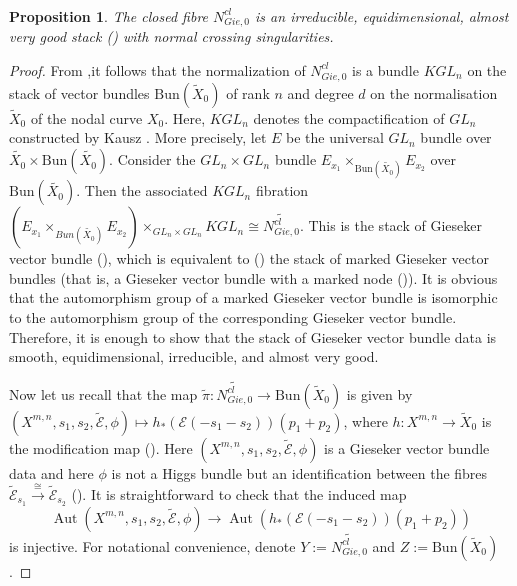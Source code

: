 \documentclass[11pt]{amsart}
\newcommand  {\Bun}   {\mathrm{Bun}}
\DeclareMathOperator{\Aut}{Aut}
\theoremstyle{plain}
\numberwithin{equation}{section}
\theoremstyle{definition}
\theoremstyle{plain}
\newtheorem{Prop}[Def]{Proposition}
\begin{document}
\

\begin{Prop}\label{new1}
The closed fibre $N^{cl}_{Gie,0}$ is an irreducible, equidimensional, almost very good stack (\cite[Definition 2.1.2]{32e}) with normal crossing singularities.
\end{Prop}

\begin{proof}
From \cite[Theorem 9.5]{16a},it follows that the normalization of $N^{cl}_{Gie,0}$ is a bundle $KGL_n$ on the stack of vector bundles $\Bun(\tilde{X}_0)$ of rank $n$ and degree $d$ on the normalisation $\tilde{X}_0$ of the nodal curve $X_0$. Here, $KGL_n$ denotes the compactification of $GL_n$ constructed by Kausz \cite{16b}. More precisely, let $E$ be the universal $GL_n$ bundle over $\tilde{X_0}\times \Bun(\tilde{X_0})$. Consider the $GL_n\times GL_n$ bundle $E_{x_1}\times_{\Bun(\tilde{X_0})} E_{x_2}$ over $\Bun(\tilde{X_0})$. Then the associated $KGL_n$ fibration $(E_{x_1}\times_{Bun(\tilde{X_0})} E_{x_2})\times_{GL_n\times GL_n} KGL_n\cong \widetilde{N^{cl}_{Gie,0}}$. This is the stack of Gieseker vector bundle (\cite[Definition 4.7]{16a}), which is equivalent to (\cite[Lemma 5.6]{DI}) the stack of marked Gieseker vector bundles (that is, a Gieseker vector bundle with a marked node (\cite[Definition 5.1]{DI})). It is obvious that the automorphism group of a marked Gieseker vector bundle is isomorphic to the automorphism group of the corresponding Gieseker vector bundle. Therefore, it is enough to show that the stack of Gieseker vector bundle data is smooth, equidimensional, irreducible, and almost very good. 
\vspace{.3cm}

Now let us recall that the map $\tilde{\pi}: \widetilde{N^{cl}_{Gie,0}}\longrightarrow \Bun(\tilde{X}_0)$ is given by $(X^{m,n}, s_1, s_2, \tilde{\mathcal E}, \phi)\mapsto h_*(\mathcal E(-s_1-s_2))(p_1+p_2)$, where $h: X^{m,n}\longrightarrow \tilde{X}_0$ is the modification map (\cite[Lemma 9.3]{16a}). Here $(X^{m,n}, s_1, s_2, \tilde{\mathcal E}, \phi)$ is a Gieseker vector bundle data and here $\phi$ is not a Higgs bundle but an identification between the fibres $\tilde{\mathcal E}_{s_1}\xrightarrow{\cong} \tilde{\mathcal E}_{s_2} $ (\cite[Definition 4.7]{16a}). It is straightforward to check that the induced map \[\Aut(X^{m,n}, s_1, s_2, \tilde{\mathcal E}, \phi)\longrightarrow \Aut(h_*(\mathcal E(-s_1-s_2))(p_1+p_2))\] is injective. For notational
convenience, denote $Y:= \widetilde{N^{cl}_{Gie,0}}$ and $Z:=\Bun(\tilde{X}_0)$. 


\end{proof}
\end{document}
